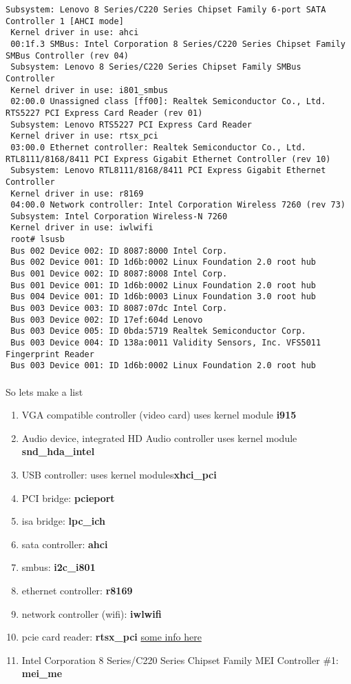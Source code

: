\documentclass[11pt,a4paper]{article}
\begin{document}
\begin{lstlisting}[style=BashInputRoot]
 Subsystem: Lenovo 8 Series/C220 Series Chipset Family 6-port SATA Controller 1 [AHCI mode]
 Kernel driver in use: ahci
 00:1f.3 SMBus: Intel Corporation 8 Series/C220 Series Chipset Family SMBus Controller (rev 04)
 Subsystem: Lenovo 8 Series/C220 Series Chipset Family SMBus Controller
 Kernel driver in use: i801_smbus
 02:00.0 Unassigned class [ff00]: Realtek Semiconductor Co., Ltd. RTS5227 PCI Express Card Reader (rev 01)
 Subsystem: Lenovo RTS5227 PCI Express Card Reader
 Kernel driver in use: rtsx_pci
 03:00.0 Ethernet controller: Realtek Semiconductor Co., Ltd. RTL8111/8168/8411 PCI Express Gigabit Ethernet Controller (rev 10)
 Subsystem: Lenovo RTL8111/8168/8411 PCI Express Gigabit Ethernet Controller
 Kernel driver in use: r8169
 04:00.0 Network controller: Intel Corporation Wireless 7260 (rev 73)
 Subsystem: Intel Corporation Wireless-N 7260
 Kernel driver in use: iwlwifi
 root# lsusb
 Bus 002 Device 002: ID 8087:8000 Intel Corp.
 Bus 002 Device 001: ID 1d6b:0002 Linux Foundation 2.0 root hub
 Bus 001 Device 002: ID 8087:8008 Intel Corp.
 Bus 001 Device 001: ID 1d6b:0002 Linux Foundation 2.0 root hub
 Bus 004 Device 001: ID 1d6b:0003 Linux Foundation 3.0 root hub
 Bus 003 Device 003: ID 8087:07dc Intel Corp.
 Bus 003 Device 002: ID 17ef:604d Lenovo
 Bus 003 Device 005: ID 0bda:5719 Realtek Semiconductor Corp.
 Bus 003 Device 004: ID 138a:0011 Validity Sensors, Inc. VFS5011 Fingerprint Reader
 Bus 003 Device 001: ID 1d6b:0002 Linux Foundation 2.0 root hub
                \end{lstlisting}

                \paragraph{} So lets make a list
                \begin{enumerate}
                    \item VGA compatible controller (video card) uses kernel module \textbf{i915}
                    \item Audio device, integrated HD Audio controller uses kernel module \textbf{snd\_hda\_intel}
                    \item USB controller: uses kernel modules\textbf{xhci\_pci}
                    \item PCI bridge: \textbf{pcieport}
                    \item isa bridge: \textbf{lpc\_ich}
                    \item sata controller: \textbf{ahci}
                    \item smbus: \textbf{i2c\_i801}
                    \item ethernet controller: \textbf{r8169}
                    \item network controller (wifi): \textbf{iwlwifi}
                    \item pcie card reader: \textbf{rtsx\_pci} \href{https://wiki.gentoo.org/wiki/Lenovo_ThinkPad_T440s#Hardware_Status}{some info here}
                    \item Intel Corporation 8 Series/C220 Series Chipset Family MEI Controller \#1: \textbf{mei\_me}
                \end{enumerate}
\end{document}
